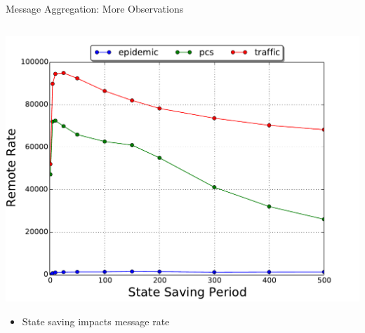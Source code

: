 \documentclass[10pt]{beamer}
\begin{document}
\begin{frame}{Message Aggregation: More Observations}

    \begin{columns}

    \begin{column}[t]{0.55\textwidth}
        \includegraphics[width=\textwidth]{../figs/state_saving/beowulf/remote_rate.pdf}
        \vspace*{-\bigskipamount}
        \begin{small}
        \begin{itemize}
            \item State saving impacts message rate
        \end{itemize}
        \end{small}
    \end{column}


\end{columns}
\end{frame}
\end{document}
